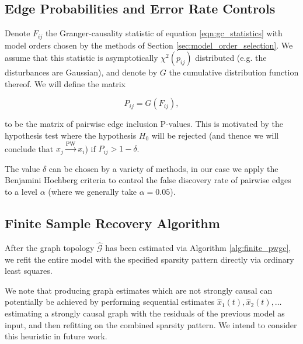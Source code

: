 \documentclass{statsoc}
\def\pwgc{\overset{\text{PW}}{\rightarrow}}  %
\def\gcg{\mathcal{G}}  %
\begin{document}
\subsection{Edge Probabilities and Error Rate Controls}
\label{sec:error_rate_control}
Denote $F_{ij}$ the Granger-causality statistic of equation
\ref{eqn:gc_statistics} with model orders chosen by the methods of
Section \ref{sec:model_order_selection}.  We assume that this
statistic is asymptotically $\chi^2(p_{ij})$ distributed (e.g. the
disturbances are Gaussian), and denote by $G$ the cumulative
distribution function thereof.  We will define the matrix

\begin{equation}
  \label{eqn:edge_inclusion_probability}
  P_{ij} = G(F_{ij}),
\end{equation}

to be the matrix of pairwise edge inclusion P-values.  This is
motivated by the hypothesis test where the hypothesis $H_0$ will be
rejected (and thence we will conclude that $x_j \pwgc x_i$) if
$P_{ij} > 1 - \delta$.

The value $\delta$ can be chosen by a variety of methods, in our case
we apply the Benjamini Hochberg criteria \cite{benjamini_hochberg}
\cite{all_of_statistics} to control the false discovery rate of
pairwise edges to a level $\alpha$ (where we generally take
$\alpha = 0.05$).

\subsection{Finite Sample Recovery Algorithm}
\label{sec:finite_pwgc}

After the graph topology $\widehat{\gcg}$ has been estimated via
Algorithm \ref{alg:finite_pwgc}, we refit the entire model with the
specified sparsity pattern directly via ordinary least squares.

We note that producing graph estimates which are not strongly causal
can potentially be achieved by performing sequential estimates
$\widehat{x}_1(t), \widehat{x}_2(t), \ldots$ estimating a strongly causal
graph with the residuals of the previous model as input, and then
refitting on the combined sparsity pattern.  We intend to consider
this heuristic in future work.
\end{document}
